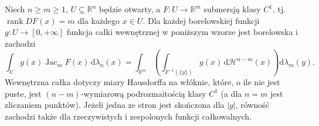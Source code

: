 \begin{twierdzenie}
\label{thm:coarea-submersion-28}
Niech $n\ge m\ge1$, $U\subseteq\mathbb R^n$
będzie otwarty, a $F:U\to\mathbb R^m$
submersją klasy $C^1$, tj.
$\operatorname{rank}DF(x)=m$ dla każdego $x\in U$.
Dla każdej borelowskiej funkcji $g:U\to[0,+\infty]$
funkcja całki wewnętrznej w poniższym wzorze jest
borelowska i zachodzi
\begin{equation}\label{eq:coarea-smooth-28}
 \int_U g(x)\operatorname{Jac}_mF(x)\,\mathrm d\lambda_n(x)
 =\int_{\mathbb R^m}\left(
 \int_{F^{-1}(\{y\})}g(x)\,\mathrm d\mathcal H^{n-m}(x)
 \right)\mathrm d\lambda_m(y).
\end{equation}
Wewnętrzna całka dotyczy miary Hausdorffa
na włóknie, które, o ile nie jest puste, jest
$(n-m)$-wymiarową podrozmaitością klasy $C^1$ (a dla
$n=m$ jest zliczaniem punktów). Jeżeli jedna ze stron
jest skończona dla $|g|$, równość zachodzi także
dla rzeczywistych i zespolonych funkcji całkowalnych.
\end{twierdzenie}
